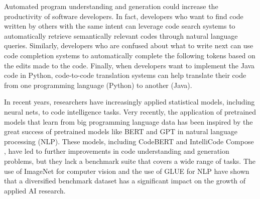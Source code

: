 \documentclass[sigconf,nonacm,screen]{acmart}
\begin{document}
Automated program understanding and generation could increase the productivity of software developers.
In fact, developers who want to find code written by others with the same intent can leverage code search systems \cite{husain2019codesearchnet,gu2018dcs,wang2020trans,premtoon2020} to automatically retrieve semantically relevant codes through natural language queries. Similarly, developers who are confused about what to write next can use code completion systems \cite{raychev2016probabilistic,allamanis2013mining,raychev2014completion,svyatkovskiy2019pythia,svyatkovskiy2020intellicode,bruch2009,hindle2012naturalness,bielik2016phog} to automatically complete the following tokens based on the edits made to the code. Finally, when developers want to implement the Java code in Python, code-to-code translation systems \cite{nguyen2015divide,karaivanov2014,chen2018tree,lachaux2020unsupervised} can help translate their code from one programming language (Python) to another (Java).


In recent years,  researchers have increasingly applied statistical models, including neural nets, to code intelligence tasks. Very recently, the application of pretrained models that learn from big programming language data has been inspired by the great success of pretrained models like BERT \cite{devlin2018bert} and GPT \cite{solaiman2019release} in natural language processing (NLP). These models, including CodeBERT \cite{feng2020codebert} and IntelliCode Compose \cite{svyatkovskiy2020intellicode}, have led to further improvements in code understanding and generation problems, but they 
lack a benchmark suite that covers a wide range of tasks. 
The use of ImageNet  \cite{deng2009imagenet} for computer vision and the use of GLUE \cite{wang2018glue} for NLP have shown that a diversified benchmark dataset has a significant impact on the growth of applied AI research.
\end{document}
